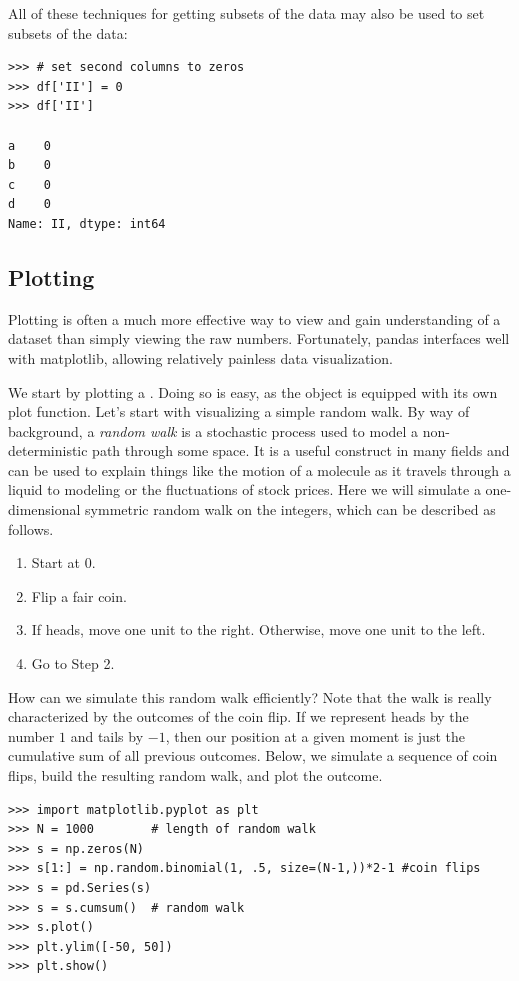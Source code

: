 All of these techniques for getting subsets of the data may also be used to set subsets of the data:
\begin{lstlisting}
>>> # set second columns to zeros
>>> df['II'] = 0
>>> df['II']

a    0
b    0
c    0
d    0
Name: II, dtype: int64
\end{lstlisting}

\subsection*{Plotting}
Plotting is often a much more effective way to view and gain understanding of a dataset than simply
viewing the raw numbers. Fortunately, pandas interfaces well with matplotlib, allowing relatively
painless data visualization.

We start by plotting a . Doing so is easy, as the  object is equipped with its own plot
function.
Let's start with visualizing a simple random walk. By way of background, a \emph{random walk} is a
stochastic process used to model a non-deterministic path through some space. It is a useful construct in
many fields and can be used to explain things like the motion of a molecule as it travels through a liquid to modeling or the fluctuations
of stock prices. Here we will simulate a one-dimensional symmetric random walk on the integers, which can be
described as follows.
\begin{enumerate}
  \item Start at 0.
  \item Flip a fair coin.
  \item If heads, move one unit to the right. Otherwise, move one unit to the left.
  \item Go to Step 2.
\end{enumerate}
How can we simulate this random walk efficiently? Note that the walk is really characterized by the outcomes
of the coin flip. If we represent heads by the number $1$ and tails by $-1$, then our position at a given moment
is just the cumulative sum of all previous outcomes. Below, we simulate a sequence of coin flips, build the
resulting random walk, and plot the outcome.
\begin{lstlisting}
>>> import matplotlib.pyplot as plt
>>> N = 1000        # length of random walk
>>> s = np.zeros(N)
>>> s[1:] = np.random.binomial(1, .5, size=(N-1,))*2-1 #coin flips
>>> s = pd.Series(s)
>>> s = s.cumsum()  # random walk
>>> s.plot()
>>> plt.ylim([-50, 50])
>>> plt.show()
\end{lstlisting}

